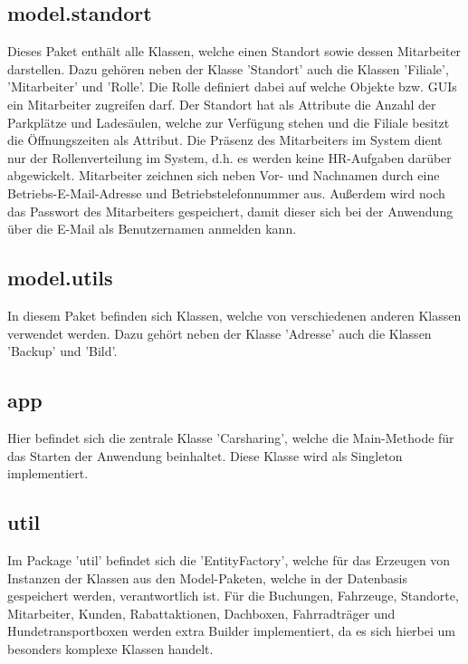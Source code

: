 \subsection{model.standort}

Dieses Paket enthält alle Klassen, welche einen Standort sowie dessen Mitarbeiter darstellen. Dazu gehören neben der Klasse 'Standort' auch die Klassen 'Filiale', 'Mitarbeiter' und 'Rolle'. Die Rolle definiert dabei auf welche Objekte bzw. GUIs ein Mitarbeiter zugreifen darf. Der Standort hat als Attribute die Anzahl der Parkplätze und Ladesäulen, welche zur Verfügung stehen und die Filiale besitzt die Öffnungszeiten als Attribut. Die Präsenz des Mitarbeiters im System dient nur der Rollenverteilung im System, d.h. es werden keine HR-Aufgaben darüber abgewickelt. Mitarbeiter zeichnen sich neben Vor- und Nachnamen durch eine Betriebs-E-Mail-Adresse und Betriebstelefonnummer aus. Außerdem wird noch das Passwort des Mitarbeiters gespeichert, damit dieser sich bei der Anwendung über die E-Mail als Benutzernamen anmelden kann.

\subsection{model.utils}

In diesem Paket befinden sich Klassen, welche von verschiedenen anderen Klassen verwendet werden. Dazu gehört neben der Klasse 'Adresse' auch die Klassen 'Backup' und 'Bild'.

\subsection{app}

Hier befindet sich die zentrale Klasse 'Carsharing', welche die Main-Methode für das Starten der Anwendung beinhaltet. Diese Klasse wird als Singleton implementiert. 

\subsection{util}

Im Package 'util' befindet sich die 'EntityFactory', welche für das Erzeugen von Instanzen der Klassen aus den Model-Paketen, welche in der Datenbasis gespeichert werden, verantwortlich ist. Für die Buchungen, Fahrzeuge, Standorte, Mitarbeiter, Kunden, Rabattaktionen, Dachboxen, Fahrradträger und Hundetransportboxen werden extra Builder implementiert, da es sich hierbei um besonders komplexe Klassen handelt. 

